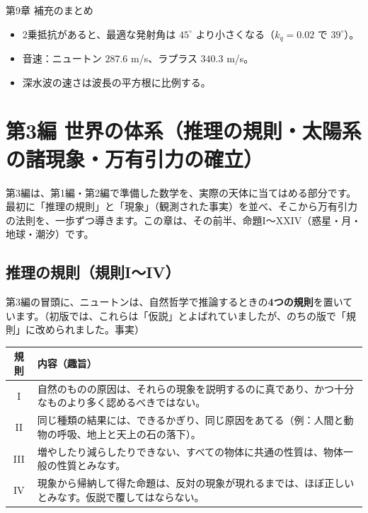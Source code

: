 \documentclass[a4paper,11pt,openany]{ltjsbook}
\begin{document}
\begin{pointbox}{第9章 補充のまとめ}
\begin{itemize}[leftmargin=*]
\item 2乗抵抗があると、最適な発射角は $45^\circ$ より小さくなる（$k_q=0.02$ で $39^\circ$）。
\item 音速：ニュートン $287.6$ m/s、ラプラス $340.3$ m/s。
\item 深水波の速さは波長の平方根に比例する。
\end{itemize}
\end{pointbox}

\chapter{第3編 世界の体系（推理の規則・太陽系の諸現象・万有引力の確立）}

第3編は、第1編・第2編で準備した数学を、実際の天体に当てはめる部分です。最初に「推理の規則」と「現象」（観測された事実）を並べ、そこから万有引力の法則を、一歩ずつ導きます。この章は、その前半、命題I〜XXIV（惑星・月・地球・潮汐）です。

\section{推理の規則（規則I〜IV）}

第3編の冒頭に、ニュートンは、自然哲学で推論するときの\textbf{4つの規則}を置いています。（初版では、これらは「仮説」とよばれていましたが、のちの版で「規則」に改められました。事実）

\begin{center}
\renewcommand{\arraystretch}{1.3}
\begin{tabular}{cp{9.5cm}}
\toprule
規則 & 内容（趣旨）\\
\midrule
I & 自然のものの原因は、それらの現象を説明するのに真であり、かつ十分なものより多く認めるべきではない。\\
II & 同じ種類の結果には、できるかぎり、同じ原因をあてる（例：人間と動物の呼吸、地上と天上の石の落下）。\\
III & 増やしたり減らしたりできない、すべての物体に共通の性質は、物体一般の性質とみなす。\\
IV & 現象から帰納して得た命題は、反対の現象が現れるまでは、ほぼ正しいとみなす。仮説で覆してはならない。\\
\bottomrule
\end{tabular}
\end{center}
\end{document}
